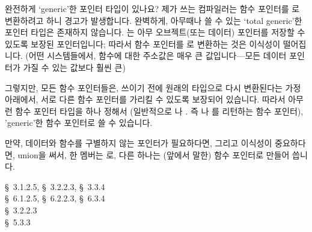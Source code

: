 \begin{faq}
        완전하게 `generic'한 포인터 타입이 있나요? 제가 쓰는 컴파일러는 함수 포인터를
        로 변환하려고 하니 경고가 발생합니다.
\A
        완벽하게, 아무때나 쓸 수 있는 `total generic'한 포인터 타입은 존재하지 않습니다.
        는 아무 오브젝트(또는 데이터) 포인터를 저장할 수 있도록 보장된 포인터입니다;
        따라서 함수 포인터를 로 변환하는 것은 이식성이 떨어집니다. (어떤 시스템들에서,
        함수에 대한 주소값은 매우 큰 값입니다---모든 데이터 포인터가 가질 수 있는 값보다 훨씬 큰)

        그렇지만, 모든 함수 포인터들은, 쓰이기 전에 원래의 타입으로 다시 변환된다는 가정 아래에서,
        서로 다른 함수 포인터를 가리킬 수 있도록 보장되어 있습니다. 따라서 아무런 함수 포인터 타입을
        하나 정해서 (일반적으로 나 . 즉 나
        를 리턴하는 함수 포인터), 'generic'한 함수 포인터로 쓸 수 있습니다.

        만약, 데이터와 함수를 구별하지 않는 포인터가 필요하다면, 그리고 이식성이 중요하다면,
        union을 써서, 한 멤버는 로, 다른 하나는 (앞에서 말한) 함수 포인터로
        만들어 씁니다.

\R
        \cite{ansi} \S\ 3.1.2.5, \S\ 3.2.2.3, \S\ 3.3.4 \\
        \cite{c89} \S\ 6.1.2.5, \S\ 6.2.2.3, \S\ 6.3.4 \\
        \cite{rationale} \S\ 3.2.2.3 \\
        \cite{hs} \S\ 5.3.3 
\end{faq}

